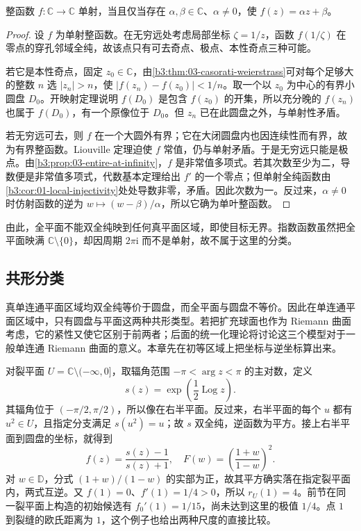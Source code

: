 \begin{theorem}[单叶整函数]\label{b3:thm:05-entire-univalent}
整函数 \(f:\mathbb C\rightarrow\mathbb C\) 单射，当且仅当存在 \(\alpha,\beta\in\mathbb C\)、\(\alpha\ne0\)，使 \(f(z)=\alpha z+\beta\)。
\end{theorem}
\begin{proof}
设 \(f\) 为单射整函数。在无穷远处考虑局部坐标 \(\zeta=1/z\)，函数 \(f(1/\zeta)\) 在零点的穿孔邻域全纯，故该点只有可去奇点、极点、本性奇点三种可能。

若它是本性奇点，固定 \(z_0\in\mathbb C\)，由\cref{b3:thm:03-casorati-weierstrass}可对每个足够大的整数 \(n\) 选 \(|z_n|>n\)，使 \(|f(z_n)-f(z_0)|<1/n\)。取一个以 \(z_0\) 为中心的有界小圆盘 \(D_0\)。开映射定理说明 \(f(D_0)\) 是包含 \(f(z_0)\) 的开集，所以充分晚的 \(f(z_n)\) 也属于 \(f(D_0)\)，有一个原像位于 \(D_0\)。但 \(z_n\) 已在此圆盘之外，与单射性矛盾。

若无穷远可去，则 \(f\) 在一个大圆外有界；它在大闭圆盘内也因连续性而有界，故为有界整函数。Liouville 定理迫使 \(f\) 常值，仍与单射矛盾。于是无穷远只能是极点。由\cref{b3:prop:03-entire-at-infinity}，\(f\) 是非常值多项式。若其次数至少为二，导数便是非常值多项式，代数基本定理给出 \(f'\) 的一个零点；但单射全纯函数由\cref{b3:cor:01-local-injectivity}处处导数非零，矛盾。因此次数为一。反过来，\(\alpha\ne0\) 时仿射函数的逆为 \(w\mapsto(w-\beta)/\alpha\)，所以它确为单叶整函数。
\end{proof}

由此，全平面不能双全纯映到任何真平面区域，即使目标无界。指数函数虽然把全平面映满 \(\mathbb C\setminus\{0\}\)，却因周期 \(2\pi\mathrm{i}\) 而不是单射，故不属于这里的分类。

\subsection{共形分类}
\label{b3:subsec:050304}

真单连通平面区域均双全纯等价于圆盘，而全平面与圆盘不等价。因此在单连通平面区域中，只有圆盘与平面这两种共形类型。若把扩充球面也作为 Riemann 曲面考虑，它的紧性又使它区别于前两者；后面的统一化理论将讨论这三个模型对于一般单连通 Riemann 曲面的意义。本章先在初等区域上把坐标与逆坐标算出来。

\ProseParagraphBreak

对裂平面 \(U=\mathbb C\setminus(-\infty,0]\)，取辐角范围 \(-\pi<\arg z<\pi\) 的主对数，定义
\[
 s(z)=\exp\left(\frac12\operatorname{Log}z\right).
\]
其辐角位于 \((-\pi/2,\pi/2)\)，所以像在右半平面。反过来，右半平面的每个 \(u\) 都有 \(u^2\in U\)，且指定分支满足 \(s(u^2)=u\)；故 \(s\) 双全纯，逆函数为平方。接上右半平面到圆盘的坐标，就得到
\[
 f(z)=\frac{s(z)-1}{s(z)+1},
 \quad F(w)=\left(\frac{1+w}{1-w}\right)^2.
\]
对 \(w\in\mathbb D\)，分式 \((1+w)/(1-w)\) 的实部为正，故其平方确实落在指定裂平面内，两式互逆。又 \(f(1)=0\)、\(f'(1)=1/4>0\)，所以 \(r_U(1)=4\)。前节在同一裂平面上构造的初始候选有 \(f_0'(1)=1/15\)，尚未达到这里的极值 \(1/4\)。点 \(1\) 到裂缝的欧氏距离为 \(1\)，这个例子也给出两种尺度的直接比较。

